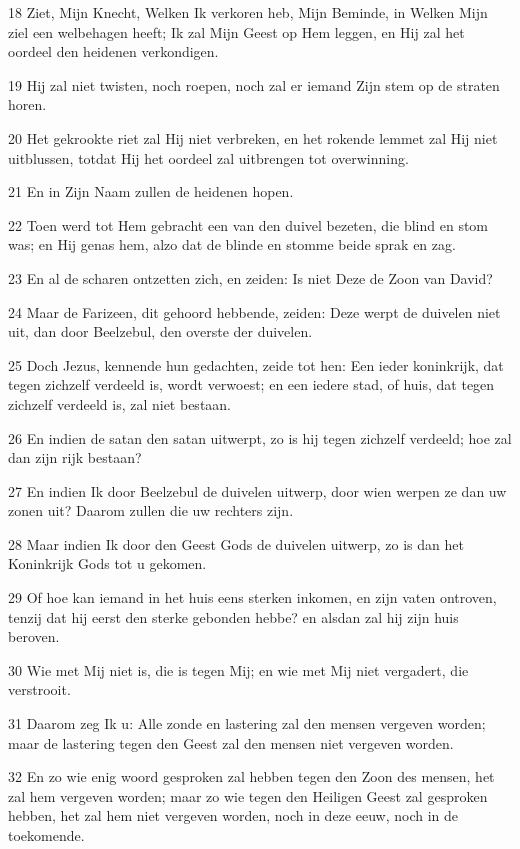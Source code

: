 \par 18 Ziet, Mijn Knecht, Welken Ik verkoren heb, Mijn Beminde, in Welken Mijn ziel een welbehagen heeft; Ik zal Mijn Geest op Hem leggen, en Hij zal het oordeel den heidenen verkondigen.
\par 19 Hij zal niet twisten, noch roepen, noch zal er iemand Zijn stem op de straten horen.
\par 20 Het gekrookte riet zal Hij niet verbreken, en het rokende lemmet zal Hij niet uitblussen, totdat Hij het oordeel zal uitbrengen tot overwinning.
\par 21 En in Zijn Naam zullen de heidenen hopen.
\par 22 Toen werd tot Hem gebracht een van den duivel bezeten, die blind en stom was; en Hij genas hem, alzo dat de blinde en stomme beide sprak en zag.
\par 23 En al de scharen ontzetten zich, en zeiden: Is niet Deze de Zoon van David?
\par 24 Maar de Farizeen, dit gehoord hebbende, zeiden: Deze werpt de duivelen niet uit, dan door Beelzebul, den overste der duivelen.
\par 25 Doch Jezus, kennende hun gedachten, zeide tot hen: Een ieder koninkrijk, dat tegen zichzelf verdeeld is, wordt verwoest; en een iedere stad, of huis, dat tegen zichzelf verdeeld is, zal niet bestaan.
\par 26 En indien de satan den satan uitwerpt, zo is hij tegen zichzelf verdeeld; hoe zal dan zijn rijk bestaan?
\par 27 En indien Ik door Beelzebul de duivelen uitwerp, door wien werpen ze dan uw zonen uit? Daarom zullen die uw rechters zijn.
\par 28 Maar indien Ik door den Geest Gods de duivelen uitwerp, zo is dan het Koninkrijk Gods tot u gekomen.
\par 29 Of hoe kan iemand in het huis eens sterken inkomen, en zijn vaten ontroven, tenzij dat hij eerst den sterke gebonden hebbe? en alsdan zal hij zijn huis beroven.
\par 30 Wie met Mij niet is, die is tegen Mij; en wie met Mij niet vergadert, die verstrooit.
\par 31 Daarom zeg Ik u: Alle zonde en lastering zal den mensen vergeven worden; maar de lastering tegen den Geest zal den mensen niet vergeven worden.
\par 32 En zo wie enig woord gesproken zal hebben tegen den Zoon des mensen, het zal hem vergeven worden; maar zo wie tegen den Heiligen Geest zal gesproken hebben, het zal hem niet vergeven worden, noch in deze eeuw, noch in de toekomende.
